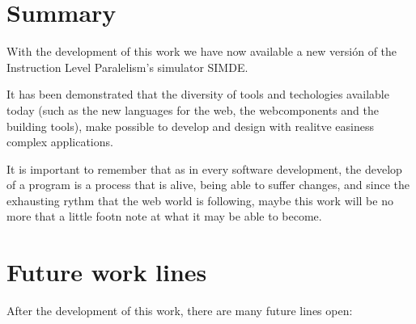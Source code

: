 
\section{Summary}
\label{8:sec:1}

With the development of this work we have now available a new versión of
the Instruction Level Paralelism's simulator SIMDE.

It has been demonstrated that the diversity of tools and techologies available today (such as 
the new languages for the web, the webcomponents and the building tools), make possible
to develop and design with realitve easiness complex applications.

It is important to remember that as in every software development, the develop of 
a program is a process that is alive, being able to suffer changes, and since the 
exhausting rythm that the web world is following, maybe this work will be no more
that a little footn note at what it may be able to become.

\section{Future work lines}
\label{8:sec:2}

After the development of this work, there are many future lines open: 

